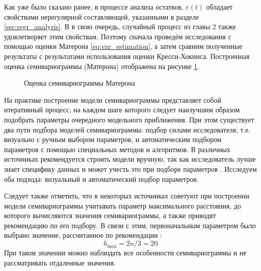 Как уже было сказано ранее, в процессе анализа остатков, $ \varepsilon(t) $ обладает свойствами нерегулярной составляющей, указанными в разделе \ref{sec:regr_analysis}. В в свою очередь, случайный процесс из главы 2 также удовлетворяет этим свойствам. Поэтому сначала проведём исследования с помощью оценки Матерона \eqref{eq:var_estimation}, а затем сравним полученные результаты с результатами использования оценки Кресси-Хокинса. Построенная оценка семивариограммы (Матерона) отображена на рисунке \ref{img:variogram}.
\begin{figure}[ht]
\caption{Оценка семивариограммы Матерона}
\label{img:variogram}
\end{figure}

На практике построение модели семивариограммы представляет собой итеративный процесс, на каждом шаге которого следует наилучшим образом подобрать параметры очередного модельного приближения. При этом существует два пути подбора моделей семивариограммы: подбор силами исследователя, т.е. визуально с ручным выбором параметров, и автоматическим подбором параметров с помощью специальных методов и алгоритмов. В различных источниках рекомендуется строить модели вручную, так как исследователь лучше знает специфику данных и может учесть это при подборе параметров \cite{geostat2010}. Исследуем оба подхода: визуальный и автоматический подбор параметров.

Следует также отметить, что в некоторых источниках советуют при построении модели семивариограммы учитывать параметр максимального расстояния, до которого вычисляются значения семивариограммы, а также приводят рекомендацию по его подбору. В связи с этим, первоначальным параметром было выбрано значение, рассчитанное по рекомендации \cite{cressie2011statistics}:
\begin{equation}
\label{eq:cutoff}
	h_{\text{max}} = 2n / 3 = 20
\end{equation}
При таком значении можно наблюдать все особенности семивариограммы и не рассматривать отдаленные значения.

